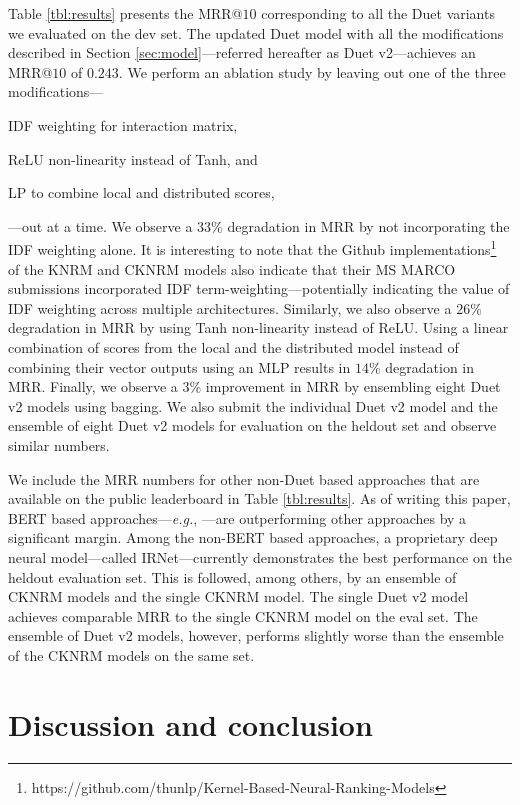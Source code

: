\documentclass{article}
\newcommand{\eg}{\emph{e.g.}}
\begin{document}
Table \ref{tbl:results} presents the MRR@$10$ corresponding to all the Duet variants we evaluated on the dev set.
The updated Duet model with all the modifications described in Section \ref{sec:model}---referred hereafter as Duet v2---achieves an MRR@$10$ of $0.243$.
We perform an ablation study by leaving out one of the three modifications---\begin{enumerate*}[label=(\roman*)]
    \item IDF weighting for interaction matrix, 
    \item ReLU non-linearity instead of Tanh, and
    \item LP to combine local and distributed scores,
\end{enumerate*}---out at a time.
We observe a $33\%$ degradation in MRR by not incorporating the IDF weighting alone.
It is interesting to note that the Github implementations\footnote{
https://github.com/thunlp/Kernel-Based-Neural-Ranking-Models
} of the KNRM \citep{xiong2017end} and CKNRM \citep{dai2018convolutional} models also indicate that their MS MARCO submissions incorporated IDF term-weighting---potentially indicating the value of IDF weighting across multiple architectures.
Similarly, we also observe a $26\%$ degradation in MRR by using Tanh non-linearity instead of ReLU.
Using a linear combination of scores from the local and the distributed model instead of combining their vector outputs using an MLP results in $14\%$ degradation in MRR.
Finally, we observe a $3\%$ improvement in MRR by ensembling eight Duet v2 models using bagging.
We also submit the individual Duet v2 model and the ensemble of eight Duet v2 models for evaluation on the heldout set and observe similar numbers.

We include the MRR numbers for other non-Duet based approaches that are available on the public leaderboard in Table \ref{tbl:results}.
As of writing this paper, BERT \citep{devlin2018bert} based approaches---\eg, \citep{nogueira2019passage}---are outperforming other approaches by a significant margin.
Among the non-BERT based approaches, a proprietary deep neural model---called IRNet---currently demonstrates the best performance on the heldout evaluation set.
This is followed, among others, by an ensemble of CKNRM \citep{dai2018convolutional} models and the single CKNRM model.
The single Duet v2 model achieves comparable MRR to the single CKNRM model on the eval set.
The ensemble of Duet v2 models, however, performs slightly worse than the ensemble of the CKNRM models on the same set. \section{Discussion and conclusion}
\label{sec:conclusion}
\end{document}
